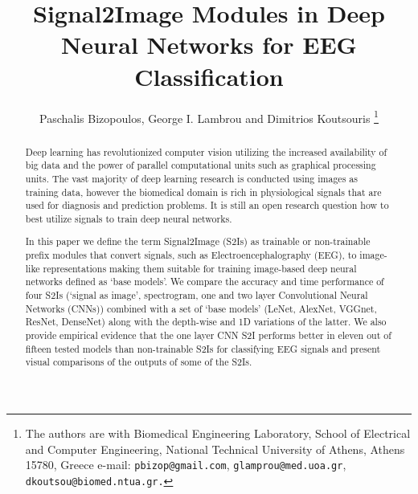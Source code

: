 \documentclass[conference]{IEEEtran}
\begin{document}
\title{Signal2Image Modules in Deep Neural Networks for EEG Classification}
\author{Paschalis Bizopoulos, George I. Lambrou and Dimitrios Koutsouris%
  \thanks{The authors are with Biomedical Engineering Laboratory, School of Electrical and Computer Engineering, National Technical University of Athens, Athens 15780, Greece e-mail: {\tt\small pbizop@gmail.com}, {\tt\small glamprou@med.uoa.gr}, {\tt\small dkoutsou@biomed.ntua.gr.}}
}

\maketitle

\begin{abstract}
  Deep learning has revolutionized computer vision utilizing the increased availability of big data and the power of parallel computational units such as graphical processing units.
  The vast majority of deep learning research is conducted using images as training data, however the biomedical domain is rich in physiological signals that are used for diagnosis and prediction problems.
  It is still an open research question how to best utilize signals to train deep neural networks.

  In this paper we define the term Signal2Image (S2Is) as trainable or non-trainable prefix modules that convert signals, such as Electroencephalography (EEG), to image-like representations making them suitable for training image-based deep neural networks defined as `base models'.
  We compare the accuracy and time performance of four S2Is (`signal as image', spectrogram, one and two layer Convolutional Neural Networks (CNNs)) combined with a set of `base models' (LeNet, AlexNet, VGGnet, ResNet, DenseNet) along with the depth-wise and 1D variations of the latter.
  We also provide empirical evidence that the one layer CNN S2I performs better in eleven out of fifteen tested models than non-trainable S2Is for classifying EEG signals and present visual comparisons of the outputs of some of the S2Is.
\end{abstract}
\end{document}
